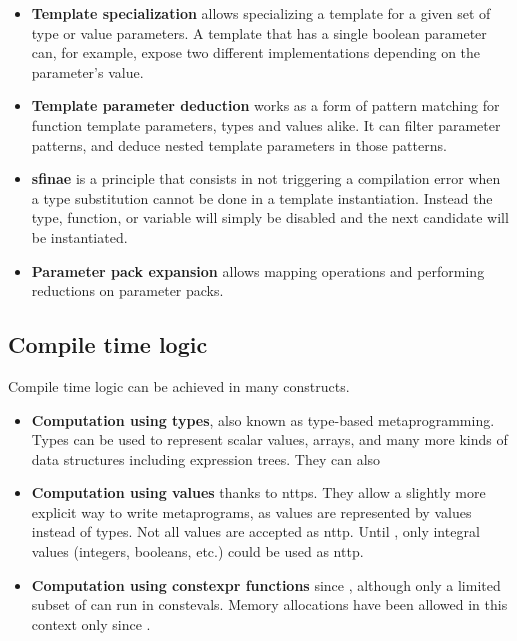 \documentclass[../main]{subfiles}
\begin{document}
\begin{itemize}
  \item

\textbf{Template specialization} allows specializing a template for a given
set of type or value parameters. A template that has a single boolean parameter
can, for example, expose two different implementations depending on the
parameter's value.

  \item

\textbf{Template parameter deduction} works as a form of pattern matching
for function template parameters, types and values alike. It can filter
parameter patterns, and deduce nested template parameters in those patterns.

  \item

\textbf{\gls{sfinae}} is a \cpp principle that consists in not triggering a
compilation error when a type substitution cannot be done in a template
instantiation. Instead the type, function, or variable will simply be disabled
and the next candidate will be instantiated.

  \item

\textbf{Parameter pack expansion} allows mapping operations and performing
reductions on parameter packs.

\end{itemize}

\subsection{
  Compile time logic
}

Compile time logic can be achieved in many \cpp constructs.

\begin{itemize}

  \item

\textbf{Computation using types}, also known as type-based metaprogramming.
Types can be used to represent scalar values, arrays, and many more
kinds of data structures including expression trees. They can also

  \item

\textbf{Computation using values} thanks to \glspl{nttp}.
They allow a slightly more explicit way to write metaprograms,
as values are represented by values instead of types.
Not all values are accepted as \gls{nttp}.
Until , only integral values (\ie integers, booleans, etc.)
could be used as \gls{nttp}.

  \item

\textbf{Computation using \gls{constexpr} functions} since ,
although only a limited subset of \cpp can run in \glspl{consteval}.
Memory allocations have been allowed in this context only since .

\end{itemize}
\end{document}
